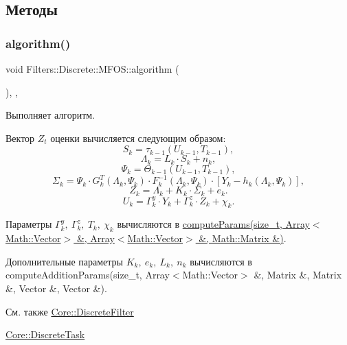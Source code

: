 \subsection{Методы}
\hypertarget{class_filters_1_1_discrete_1_1_m_f_o_s_a88e35ad4500d57e81be035959ab9bb5c}{}\label{class_filters_1_1_discrete_1_1_m_f_o_s_a88e35ad4500d57e81be035959ab9bb5c} 
\subsubsection{\texorpdfstring{algorithm()}{algorithm()}}
{\footnotesize\ttfamily void Filters\+::\+Discrete\+::\+M\+F\+O\+S\+::algorithm (\begin{DoxyParamCaption}{ }\end{DoxyParamCaption})\hspace{0.3cm}{\ttfamily [override]}, {\ttfamily [protected]}, {\ttfamily [virtual]}}



Выполняет алгоритм. 

Вектор $Z_t$ оценки вычисляется следующим образом\+: \[S_{k} = \tau_{k-1}(U_{k-1}, T_{k-1}),\] \[\Lambda_k = L_{k} \cdot S_{k} + n_{k},\] \[\Psi_k = \Theta_{k-1}(U_{k-1}, T_{k-1}),\] \[\Sigma_k = \Psi_k \cdot G_k^T(\Lambda_k, \Psi_k) \cdot F_k^{-1}(\Lambda_k, \Psi_k) \cdot [Y_k - h_k(\Lambda_k, \Psi_k)],\] \[Z_k = \Lambda_k + K_k \cdot \Sigma_k + e_k.\] \[U_k = \Gamma_k^y \cdot Y_k + \Gamma_k^z \cdot Z_k + \chi_k.\]

Параметры $\Gamma_k^y,\ \Gamma_k^z,\ T_k,\ \chi_k$ вычисляются в \hyperlink{class_filters_1_1_discrete_1_1_m_f_o_s_aa8e5e6ebd6325efc56ef40a2d72303be}{compute\+Params(size\+\_\+t, Array$<$\+Math\+::\+Vector$>$ \&, Array$<$\+Math\+::\+Vector$>$ \&, Math\+::\+Matrix \&)}.

Дополнительные параметры $K_k,\ e_k,\ L_{k},\ n_{k}$ вычисляются в compute\+Addition\+Params(size\+\_\+t, Array$<$\+Math\+::\+Vector$>$ \&, Matrix \&, Matrix \&, Vector \&, Vector \&).

\begin{DoxySeeAlso}{См. также}
\hyperlink{class_core_1_1_discrete_filter}{Core\+::\+Discrete\+Filter} 

\hyperlink{class_core_1_1_discrete_task}{Core\+::\+Discrete\+Task} 
\end{DoxySeeAlso}


